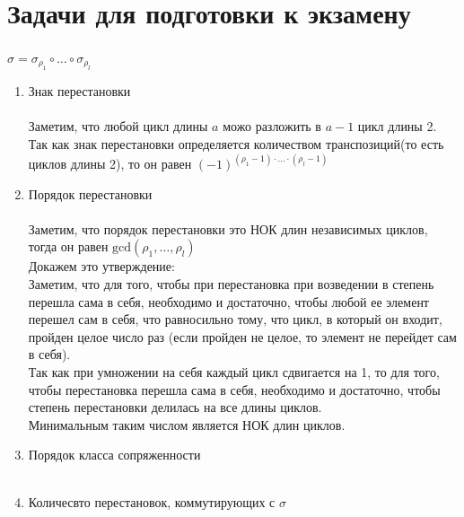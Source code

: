 \newpage		
	\section{Задачи для подготовки к экзамену}
		
		\subsection{}
		$\sigma = \sigma_{\rho_{1}} \circ \ldots \circ \sigma_{\rho_{l}}$
 		\begin{enumerate}
			\item Знак перестановки\\
				\\
				Заметим, что любой цикл длины $a$ можо разложить в $a-1$ цикл длины 2. Так как знак перестановки определяется количеством транспозиций(то есть циклов длины 2), то он равен $(-1)^{(\rho_{1} - 1) \cdot \ldots \cdot (\rho_{l} - 1)}$
				
			\item Порядок перестановки\\
				\\
				Заметим, что порядок перестановки это НОК длин независимых циклов, тогда он равен $\text{gcd}(\rho_{1}, \ldots , \rho_{l})$\\
				Докажем это утверждение:\\
				Заметим, что для того, чтобы при перестановка при возведении в степень перешла сама в себя, необходимо и достаточно, чтобы любой ее элемент перешел сам в себя, что равносильно тому, что цикл, в который он входит, пройден целое число раз (если пройден не целое, то элемент не перейдет сам в себя).\\
				Так как при умножении на себя каждый цикл сдвигается на 1, то для того, чтобы перестановка перешла сама в себя, необходимо и достаточно, чтобы степень перестановки делилась на все длины циклов.\\ Минимальным таким числом является НОК длин циклов.
			
			\item Порядок класса сопряженности\\
				\\
			
			
			\item Количесвто перестановок, коммутирующих с $\sigma$\\
				\\
			
		\end{enumerate}
		
